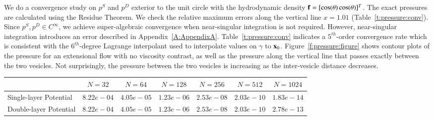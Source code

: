 We do a convergence study on $p^{S}$ and $p^{D}$ exterior to the unit
circle with the hydrodynamic density ${\mathbf{f}} = [\cos(\theta)
\cos(\theta)]^{T}$.  The exact pressures are calculated using the
Residue Theorem.  We check the relative maximum errors along the
vertical line $x=1.01$ (Table~\ref{t:pressure:conv}).  Since
$p^{S},p^{D} \in C^{\infty}$, we achieve super-algebraic convergence
when near-singular integration is not required.  However, near-singular
integration introduces an error described in
Appendix~\ref{A:AppendixA}.  Table~\ref{t:pressure:conv} indicates a
$5^{th}$-order convergence rate which is consistent with the
$6^{th}$-degree Lagrange interpolant used to interpolate values on
$\gamma$ to ${\mathbf{x}}_{0}$.  Figure~\ref{f:pressure:figure} shows contour
plots of the pressure for an extensional flow with no viscosity
contrast, as well as the pressure along the vertical line that passes
exactly between the two vesicles.  Not surprisingly, the pressure
between the two vesicles is increasing as the inter-vesicle distance
decreases.
\begin{table}[htp]
\begin{centering}
\begin{tabular}{l|cccccc}
& $N=32$ & $N=64$ & $N=128$ & $N=256$ & $N=512$ & $N=1024$ \\
\hline
Single-layer Potential & 
  $8.22e-04$ & $4.05e-05$ & $1.23e-06$ & $2.53e-08$ & $2.03e-10$ & $1.83e-14$ \\ 
Double-layer Potential & 
  $8.22e-04$ & $4.05e-05$ & $1.23e-06$ & $2.53e-08$ & $2.03e-10$ & $2.78e-13$ 
\end{tabular}
\end{centering}
\end{table}


